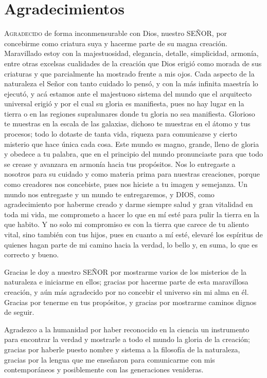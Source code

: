 \chapter*{Agradecimientos}

\lettrine[lines=2]{A}{gradecido} de forma inconmensurable con Dios, nuestro SEÑOR, por concebirme como criatura suya y hacerme parte de su magna creación. Maravillado estoy con la majestuosidad, elegancia, detalle, simplicidad, armonía, entre otras excelsas cualidades de la creación que Dios erigió como morada de sus criaturas y que parcialmente ha mostrado frente a mis ojos. Cada aspecto de la naturaleza el Señor con tanto cuidado lo pensó, y con la más infinita maestría lo ejecutó, y acá estamos ante el majestuoso sistema del mundo que el arquitecto universal erigió y por el cual su gloria es manifiesta, pues no hay lugar en la tierra o en las regiones supralunares donde tu gloria no sea manifiesta. Glorioso te muestras en la escala de las galaxias, dichoso te muestras en el átomo y tus procesos; todo lo dotaste de tanta vida, riqueza para comunicarse y cierto misterio que hace única cada cosa. Este mundo es magno, grande, lleno de gloria y obedece a tu palabra, que en el principio del mundo pronunciaste para que todo se crease y avanzara en armonía hacia tus propósitos. Nos lo entregaste a nosotros para su cuidado y como materia prima para nuestras creaciones, porque como creadores nos concebiste, pues nos hiciste a tu imagen y semejanza. Un mundo nos entregaste y un mundo te entregaremos, y DIOS, como agradecimiento por haberme creado y darme siempre salud y gran vitalidad en toda mi vida, me comprometo a hacer lo que en mí esté para pulir la tierra en la que habito. Y no solo mi compromiso es con la tierra que carece de tu aliento vital, sino también con tus hijos, pues en cuanto a mí esté, elevaré los espíritus de quienes hagan parte de mi camino hacia la verdad, lo bello y, en suma, lo que es correcto y bueno.

Gracias le doy a nuestro SEÑOR por mostrarme varios de los misterios de la naturaleza e iniciarme en ellos; gracias por hacerme parte de esta maravillosa creación, y aún más agradecido por no concebir el universo sin mi alma en él. Gracias por tenerme en tus propósitos, y gracias por mostrarme caminos dignos de seguir.

Agradezco a la humanidad por haber reconocido en la ciencia un instrumento para encontrar la verdad y mostrarle a todo el mundo la gloria de la creación; gracias por haberle puesto nombre y sistema a la filosofía de la naturaleza, gracias por la lengua que me enseñaron para comunicarme con mis contemporáneos y posiblemente con las generaciones venideras.


